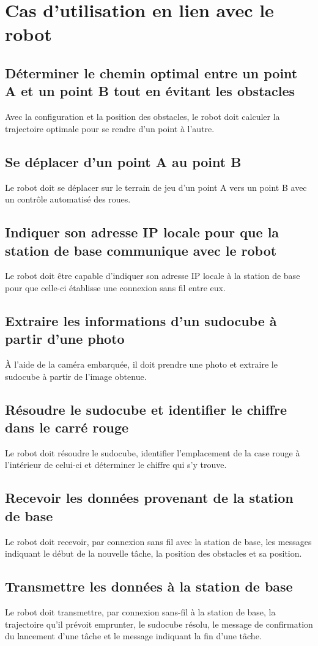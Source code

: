 \section{Cas d'utilisation en lien avec le robot}
\subsection{Déterminer le chemin optimal entre un point A et un point B tout en évitant les obstacles}
Avec la configuration et la position des obstacles, le robot doit calculer la trajectoire optimale pour se rendre d'un point à l'autre.
\subsection{Se déplacer d'un point A au point B}
Le robot doit se déplacer sur le terrain de jeu d'un point A vers un point B avec un contrôle automatisé des roues.
\subsection{Indiquer son adresse IP locale pour que la station de base communique avec le robot}
Le robot doit être capable d'indiquer son adresse IP locale à la station de base pour que celle-ci établisse une connexion sans fil entre eux.
\subsection{Extraire les informations d'un sudocube à partir d'une photo}
À l'aide de la caméra embarquée, il doit prendre une photo et extraire le sudocube à partir de l'image obtenue.
\subsection{Résoudre le sudocube et identifier le chiffre dans le carré rouge}
Le robot doit résoudre le sudocube, identifier l'emplacement de la case rouge à l'intérieur de celui-ci et déterminer le chiffre qui s'y trouve.
\subsection{Recevoir les données provenant de la station de base}
Le robot doit recevoir, par connexion sans fil avec la station de base, les messages indiquant le début de la nouvelle tâche, la position des obstacles et sa position.
\subsection{Transmettre les données à la station de base}
Le robot doit transmettre, par connexion sans-fil à la station de base, la trajectoire qu’il prévoit emprunter, le sudocube résolu, le message de confirmation du lancement d'une tâche et le message indiquant la fin d'une tâche.
